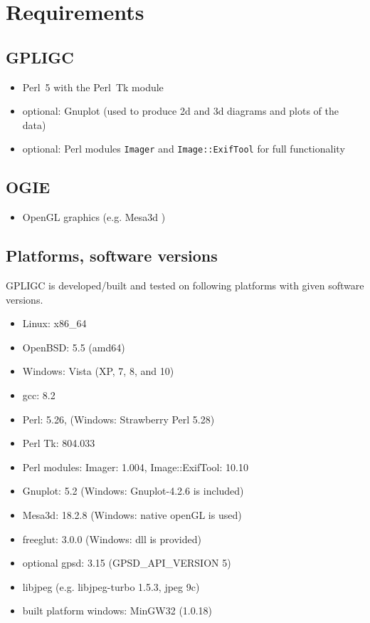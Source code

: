 \section{Requirements}
\label{requirements}

\subsection*{GPLIGC}

\begin{itemize}
\item Perl~5 with the Perl~Tk module \cite{perl,perltk}
\item {\scriptsize optional:} Gnuplot \cite{gnuplot} (used to produce 2d and 3d diagrams and plots of the data)
\item {\scriptsize optional:} Perl modules \texttt{Imager} \cite{imager} and \texttt{Image::ExifTool} \cite{exiftool} for full functionality
\end{itemize}


\subsection*{OGIE}

\begin{itemize}
\item OpenGL graphics (e.g. Mesa3d \cite{mesa})
\end{itemize}


\subsection*{Platforms, software versions}
GPLIGC is developed/built and tested on following platforms with given software versions.

\begin{itemize}
\item Linux: x86\_64
\item OpenBSD: 5.5 (amd64)
\item Windows: Vista (XP, 7, 8, and 10)
\item gcc: 8.2 %
\item Perl: 5.26, %
(Windows: Strawberry Perl 5.28)
\item Perl Tk: 804.033
\item Perl modules: Imager: 1.004, %
Image::ExifTool: 10.10
\item Gnuplot: 5.2 (Windows: Gnuplot-4.2.6 is included)
\item Mesa3d: 18.2.8 (Windows: native openGL is used)
\item freeglut: 3.0.0 (Windows: dll is provided)
\item {\scriptsize optional} gpsd: 3.15 (GPSD\_API\_VERSION 5)
\item libjpeg (e.g. libjpeg-turbo 1.5.3, jpeg 9c)
\item built platform windows: MinGW32 (1.0.18)
\end{itemize}
